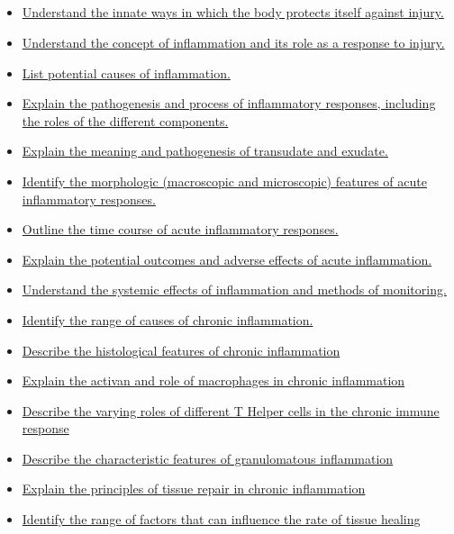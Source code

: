 \documentclass[10pt, a4paper]{article}
\begin{document}
\subsection{} \begin{itemize} \item \href{https://www.notion.so/7a16210c4f044e0098a97ffd02f6284f}{Understand the innate ways in which the body protects itself against injury.} \item \href{https://www.notion.so/de0ad94c4ee7499f9188441b21b9ba35}{Understand the concept of inflammation and its role as a response to injury.} \item \href{https://www.notion.so/abeaf83d13394d3c971aca815b807020}{List potential causes of inflammation.} \item \href{https://www.notion.so/6f9427a3ba9648a78dfc0df6c00f97a3}{Explain the pathogenesis and process of inflammatory responses, including the roles of the different components.} \item \href{https://www.notion.so/e31f59b9f575471f96d0807f3c8216f6}{Explain the meaning and pathogenesis of transudate and exudate.} \item \href{https://www.notion.so/513317b8354b46ba98426fb92a0c48e1}{Identify the morphologic (macroscopic and microscopic) features of acute inflammatory responses.} \item \href{https://www.notion.so/9acba085bc0c44fe9d8ce8ffb4d723aa}{Outline the time course of acute inflammatory responses.} \item \href{https://www.notion.so/2c37b88df00d4c98aea370348fa4ce94}{Explain the potential outcomes and adverse effects of acute inflammation.} \item \href{https://www.notion.so/5d231658573a4abd99cfda5de47fffb1}{Understand the systemic effects of inflammation and methods of monitoring.} \item \href{https://www.notion.so/788e7652afc241fa99d123c543353672}{Identify the range of causes of chronic inflammation.} \item \href{https://www.notion.so/799a41fc8d26485ea00ac10335491a01}{Describe the histological features of chronic inflammation} \item \href{https://www.notion.so/898a508391ba4bee88f7a78f1ef57035}{Explain the activan and role of macrophages in chronic inflammation} \item \href{https://www.notion.so/aaba507b478e4d8897051be0db1bafc5}{Describe the varying roles of different T Helper cells in the chronic immune response} \item \href{https://www.notion.so/a668403aa2c14407932fd036ef4bdc3d}{Describe the characteristic features of granulomatous inflammation} \item \href{https://www.notion.so/b7a971a7dcc04fd5a64317afb38d98c0}{Explain the principles of tissue repair in chronic inflammation} \item \href{https://www.notion.so/4b37723b61f849c6ad74e3feb8b741ff}{Identify the range of factors that can influence the rate of tissue healing} \end{itemize}
\end{document}
